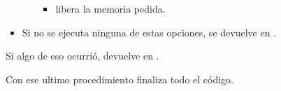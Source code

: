 \begin{itemize}
\begin{itemize}
\begin{itemize}
                    \item {} libera la memoria pedida.

                 \end{itemize}

        \end{itemize}

    \item Si no se ejecuta ninguna de estas opciones, se devuelve 
        en .

\end{itemize}

Si algo de eso ocurrió, devuelve  en .


Con ese ultimo procedimiento finaliza todo el código.
